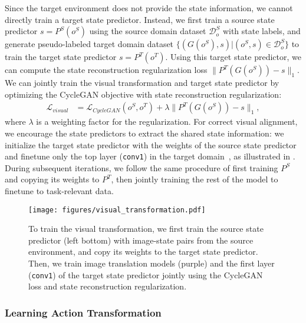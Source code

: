 Since the target environment does not provide the state information, we cannot directly train a target state predictor. Instead, we first train a source state predictor $s = P^{S}(o^{S})$ using the source domain dataset $\mathcal{D}_o^S$ with state labels, and generate pseudo-labeled target domain dataset $\{(G(o^S), s)|(o^S, s) \in \mathcal{D}_o^S \}$ to train the target state predictor $s = P^{T}(o^{T})$. Using this target state predictor, we can compute the state reconstruction regularization loss $\lVert P^{T}(G(o^{S})) - s \rVert_1$. We can jointly train the visual transformation and target state predictor by optimizing the CycleGAN objective with state reconstruction regularization:
\begin{equation}
\begin{aligned}
    \label{eqn:visual_loss}
    \mathcal{L}_{visual} &= \mathcal{L}_{CycleGAN}(o^{S}, o^{T}) + \lambda \lVert P^{T}(G(o^{S})) - s \rVert_1,
\end{aligned}
\end{equation}
where $\lambda$ is a weighting factor for the regularization. For correct visual alignment, we encourage the state predictors to extract the shared state information: we initialize the target state predictor with the weights of the source state predictor and finetune only the top layer (\texttt{conv1}) in the target domain~\citep{aytar2017crossmodal, jeong2020selfsupervised}, as illustrated in .  During subsequent iterations, we follow the same procedure of first training $P^{S}$ and copying its weights to $P^{T}$, then jointly training the rest of the model to finetune to task-relevant data.


\begin{figure}[t]
    \centering
    \texttt{[image: figures/visual\_transformation.pdf]}
    \caption{
        To train the visual transformation, we first train the source state predictor (left bottom) with image-state pairs from the source environment, and copy its weights to the target state predictor. Then, we train image translation models (purple) and the first layer (\texttt{conv1}) of the target state predictor jointly using the CycleGAN loss and state reconstruction regularization.
    }
    \label{fig:visual_transformation}
\end{figure}


\subsubsection{\textbf{Learning Action Transformation}}
\label{sec:action_transformation}

